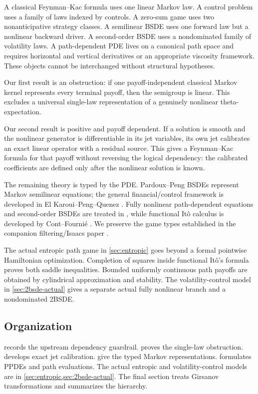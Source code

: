 \documentclass[11pt,reqno]{amsart}
\theoremstyle{definition}
\theoremstyle{remark}
\begin{document}
A classical Feynman--Kac formula uses one linear Markov law.  A control problem
uses a family of laws indexed by controls.  A zero-sum game uses two
nonanticipative strategy classes.  A semilinear BSDE uses one forward law but a
nonlinear backward driver.  A second-order BSDE uses a nondominated family of
volatility laws.  A path-dependent PDE lives on a canonical path space and
requires horizontal and vertical derivatives or an appropriate viscosity
framework.  These objects cannot be interchanged without structural
hypotheses.

Our first result is an obstruction: if one payoff-independent classical Markov
kernel represents every terminal payoff, then the semigroup is linear.  This
excludes a universal single-law representation of a genuinely nonlinear
theta-expectation.

Our second result is positive and payoff dependent.  If a solution is smooth
and the nonlinear generator is differentiable in its jet variables, its own
jet calibrates an exact linear operator with a residual source.  This gives a
Feynman--Kac formula for that payoff without reversing the logical dependency:
the calibrated coefficients are defined only after the nonlinear solution is
known.

The remaining theory is typed by the PDE.  Pardoux--Peng BSDEs
\cite{PardouxPeng1990} represent Markov semilinear equations; the general
financial/control framework is developed in El Karoui--Peng--Quenez
\cite{ElKarouiPengQuenez1997}.  Fully nonlinear path-dependent equations and
second-order BSDEs are treated in
\cite{SonerTouziZhang2012,EkrenTouziZhang2014I,EkrenTouziZhang2014II}, while
functional It\^o calculus is developed by Cont--Fourni\'e
\cite{ContFournie2013}.  We preserve the game types established in the
companion filtering/Isaacs paper \cite{QiGames}.

The actual entropic path game in \cref{sec:entropic} goes beyond a formal
pointwise Hamiltonian optimization.  Completion of squares inside functional
It\^o's formula proves both saddle inequalities.  Bounded uniformly continuous
path payoffs are obtained by cylindrical approximation and stability.  The
volatility-control model in \cref{sec:2bsde-actual} gives a separate actual
fully nonlinear branch and a nondominated 2BSDE.

\subsection*{Organization}
 records the upstream dependency guardrail.
 proves the single-law obstruction.
 develops exact jet calibration.
 give the typed Markov
representations.   formulates PPDEs and path evaluations.  The
actual entropic and volatility-control models are in
\cref{sec:entropic,sec:2bsde-actual}.  The final section treats Girsanov
transformations and summarizes the hierarchy.
\end{document}
